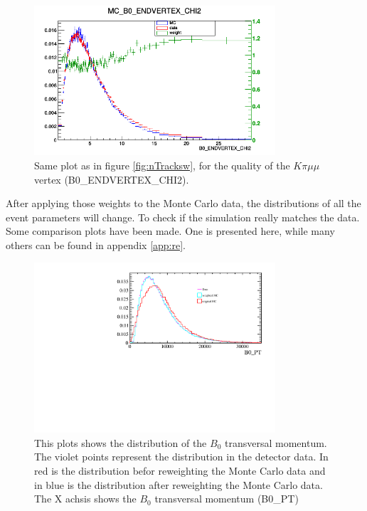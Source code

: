 \documentclass[english]{uzhpub}
\begin{document}
\begin{figure}[H]
\centering
\includegraphics[width=0.8\textwidth]{Reweighting/B0_ENDVERTEX_CHI2w}
\caption{Same plot as in figure \ref{fig:nTracksw}, for the quality of the $K \pi \mu \mu$ vertex (B0\_ENDVERTEX\_CHI2).}
\label{fig:B0_ENDVERTEX_CHI2w}
\end{figure}

After applying those weights to the Monte Carlo data, the distributions of all the event parameters will change. To check if the simulation really matches the data. Some comparison plots have been made. One is presented here, while many others can be found in appendix \ref{app:re}.

\begin{figure}[H]
\centering
\includegraphics[width=0.8\textwidth]{Reweighting/B0_PT}
\caption{This plots shows the distribution of the $B_0$ transversal momentum. The violet points represent the distribution in the detector data. In red is the distribution befor reweighting the Monte Carlo data and in blue is the distribution after reweighting the Monte Carlo data. The X achsis shows the $B_0$ transversal momentum (B0\_PT)}
\label{fig:B0_PT}
\end{figure}
\end{document}
